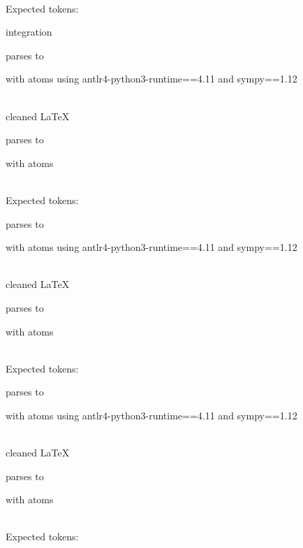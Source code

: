 \documentclass{article}
\begin{document}
\ \\
Expected tokens:



\hrulefill


integration

parses to

with atoms
using antlr4-python3-runtime==4.11 and sympy==1.12

\ \\
cleaned \LaTeX

parses to

with atoms


\ \\
Expected tokens:



\hrulefill



parses to

with atoms
using antlr4-python3-runtime==4.11 and sympy==1.12

\ \\
cleaned \LaTeX

parses to

with atoms


\ \\
Expected tokens:


\hrulefill



parses to

with atoms
using antlr4-python3-runtime==4.11 and sympy==1.12

\ \\
cleaned \LaTeX

parses to

with atoms


\ \\
Expected tokens:

\end{document}
